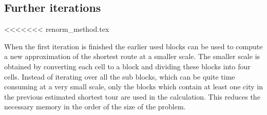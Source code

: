 \subsection{Further iterations}
<<<<<<< renorm_method.tex


When the first iteration is finished the earlier used blocks can be used to
compute a new approximation of the shortest route at a smaller scale. The
smaller scale is obtained by converting each cell to a block and dividing
these blocks into four cells. Instead of iterating over all the sub blocks,
which can be quite time consuming at a very small scale, only the blocks which
contain at least one city in the previous estimated shortest tour are
used in the calculation. This reduces the necessary memory in the order of the
size of the problem.

